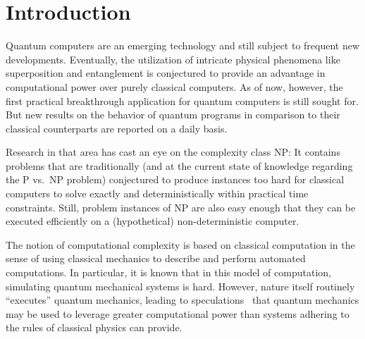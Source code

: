 \section{Introduction}


Quantum computers are an emerging technology and still subject to frequent new developments. Eventually, the utilization of intricate physical phenomena like superposition and entanglement is conjectured to provide an advantage in computational power over purely classical computers. As of now, however, the first practical breakthrough application for quantum computers is still sought for. But new results on the behavior of quantum programs in comparison to their classical counterparts are reported on a daily basis.

Research in that area has cast an eye on the complexity class NP: It contains problems that are traditionally (and at the current state of knowledge regarding the P vs.\ NP problem) conjectured to produce instances too hard for classical computers to solve exactly and deterministically within practical time constraints. Still, problem instances of NP are also easy enough that they can be executed efficiently on a (hypothetical) non-deterministic computer.

The notion of computational complexity is based on classical
computation in the sense of using classical mechanics to describe and
perform automated computations. In particular, it is known that in this
model of computation, simulating quantum mechanical systems is hard. However, nature itself routinely ``executes'' quantum mechanics, leading to
speculations~\cite{feynman1981simulating} that quantum mechanics may be used to leverage 
 greater computational power than systems adhering to the rules of classical physics
can provide.

